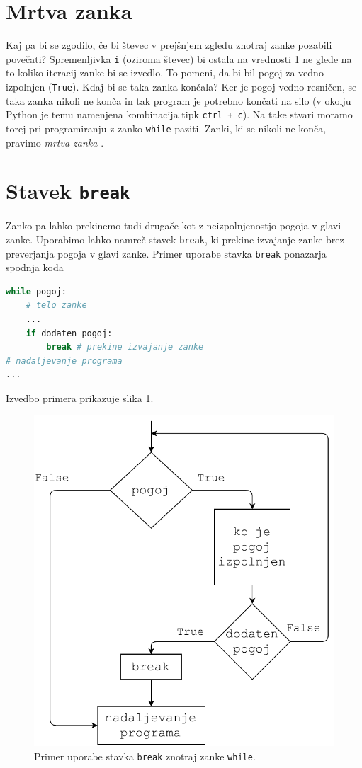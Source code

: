 \section{Mrtva zanka}

Kaj pa bi se zgodilo, če bi števec v prejšnjem zgledu znotraj zanke pozabili povečati? Spremenljivka \texttt{i} (oziroma števec) bi ostala na vrednosti 1 ne glede na to koliko iteracij zanke bi se izvedlo. To pomeni, da bi bil pogoj za vedno izpolnjen (\texttt{True}). Kdaj bi se taka zanka končala? Ker je pogoj vedno resničen, se taka zanka nikoli ne konča in tak program je potrebno končati na silo (v okolju Python je temu namenjena kombinacija tipk \texttt{ctrl + c}). Na take stvari moramo torej pri programiranju z zanko \texttt{while} paziti. Zanki, ki se nikoli ne konča, pravimo \emph{mrtva zanka} .

\section{Stavek \texttt{break}}
Zanko pa lahko prekinemo tudi drugače kot z neizpolnjenostjo pogoja v glavi zanke. Uporabimo lahko namreč stavek \texttt{break}, ki prekine izvajanje zanke brez preverjanja pogoja v glavi zanke. Primer uporabe stavka \texttt{break} ponazarja spodnja koda
\begin{lstlisting}[language=Python]
while pogoj:
    # telo zanke
    ...
    if dodaten_pogoj: 
        break # prekine izvajanje zanke
# nadaljevanje programa
...
\end{lstlisting}
Izvedbo primera prikazuje slika \ref{img:while2}. 
\begin{figure}
    \centering
    \includegraphics[width=0.5\linewidth]{img/while2.pdf}
    \caption{Primer uporabe stavka \texttt{break} znotraj zanke \texttt{while}.}
    \label{img:while2}
\end{figure}

